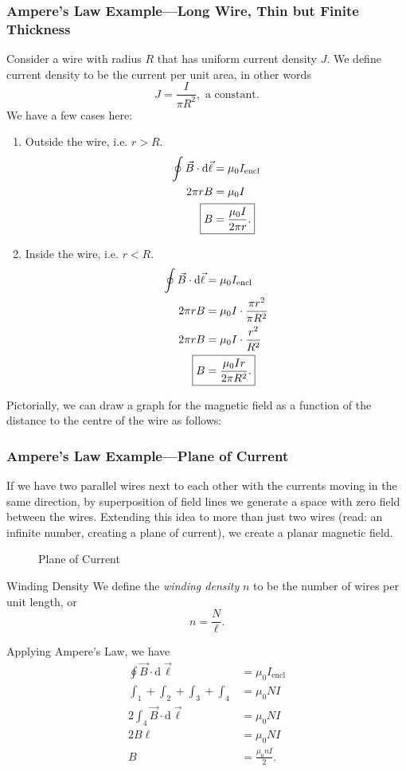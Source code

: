 \documentclass[class=article, crop=false]{standalone}
\begin{document}
  \subsubsection{Ampere's Law Example---Long Wire, Thin but Finite Thickness}
  Consider a wire with radius $R$ that has uniform current density $J$. We define current density to be the current per unit area, in other words
  \[
    J = \frac{I}{\pi R^2}, \text{ a constant}.
  \]
  We have a few cases here:
  \begin{enumerate}[label=(\alph*)]
    \item Outside the wire, i.e. $r > R$.
    \begin{align*}
      \oint \vec{B}\cdot \mathrm{d}\vec{\ell} &= \mu_0I_\text{encl} \\
      2\pi rB &= \mu_0I \\
      \Aboxed{B &= \frac{\mu_0I}{2\pi r}.}
    \end{align*}
    \item Inside the wire, i.e. $r < R$.
    \begin{align*}
      \oint \vec{B}\cdot \mathrm{d}\vec{\ell} &= \mu_0I_\text{encl} \\
      2\pi rB &= \mu_0I\cdot \frac{\pi r^2}{\pi R^2} \\
      2\pi rB &= \mu_0I\cdot \frac{r^2}{R^2} \\
      \Aboxed{B &= \frac{\mu_0Ir}{2\pi R^2}.}
    \end{align*}
  \end{enumerate}
  Pictorially, we can draw a graph for the magnetic field as a function of the distance to the centre of the wire as follows:
  \begin{center}\end{center}
  \subsubsection{Ampere's Law Example---Plane of Current}
  If we have two parallel wires next to each other with the currents moving in the same direction, by superposition of field lines we generate a space with zero field between the wires. Extending this idea to more than just two wires (read: an infinite number, creating a plane of current), we create a planar magnetic field. 
  \begin{figure}[ht]
    \centering
    \caption{Plane of Current}
  \end{figure}
  \begin{definition}{Winding Density}
    We define the \emph{winding density} $n$ to be the number of wires per unit length, or 
    \[
      n = \frac{N}{\ell}.
    \]
  \end{definition}
  Applying Ampere's Law, we have
  \begin{align*}
    \oint \vec{B}\cdot \mathrm{d}\vec{\ell} &= \mu_0I_\text{encl} \\
    \int_1 + \int_2 + \int_3 + \int_4 &= \mu_0NI\\
    2\int_4 \vec{B}\cdot \mathrm{d}\vec{\ell} &= \mu_0NI\\
    2B\ell &= \mu_0NI \\
    B &= \frac{\mu_0nI}{2}.
  \end{align*}
\end{document}

